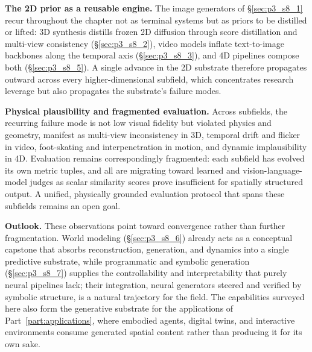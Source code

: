 \textbf{The 2D prior as a reusable engine.} The image generators of §\ref{sec:p3_s8_1} recur throughout the chapter not as terminal systems but as priors to be distilled or lifted: 3D synthesis distills frozen 2D diffusion through score distillation and multi-view consistency (§\ref{sec:p3_s8_2}), video models inflate text-to-image backbones along the temporal axis (§\ref{sec:p3_s8_3}), and 4D pipelines compose both (§\ref{sec:p3_s8_5}). A single advance in the 2D substrate therefore propagates outward across every higher-dimensional subfield, which concentrates research leverage but also propagates the substrate's failure modes.

\textbf{Physical plausibility and fragmented evaluation.} Across subfields, the recurring failure mode is not low visual fidelity but violated physics and geometry, manifest as multi-view inconsistency in 3D, temporal drift and flicker in video, foot-skating and interpenetration in motion, and dynamic implausibility in 4D. Evaluation remains correspondingly fragmented: each subfield has evolved its own metric tuples, and all are migrating toward learned and vision-language-model judges as scalar similarity scores prove insufficient for spatially structured output. A unified, physically grounded evaluation protocol that spans these subfields remains an open goal.

\textbf{Outlook.} These observations point toward convergence rather than further fragmentation. World modeling (§\ref{sec:p3_s8_6}) already acts as a conceptual capstone that absorbs reconstruction, generation, and dynamics into a single predictive substrate, while programmatic and symbolic generation (§\ref{sec:p3_s8_7}) supplies the controllability and interpretability that purely neural pipelines lack; their integration, neural generators steered and verified by symbolic structure, is a natural trajectory for the field. The capabilities surveyed here also form the generative substrate for the applications of Part~\ref{part:applications}, where embodied agents, digital twins, and interactive environments consume generated spatial content rather than producing it for its own sake.
